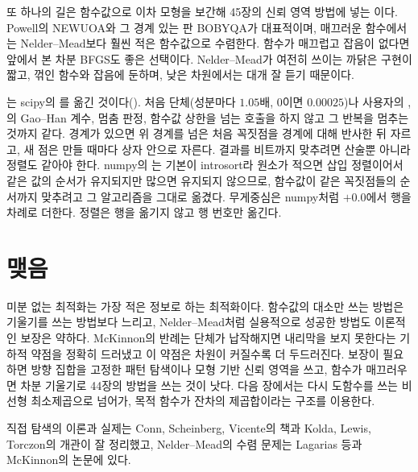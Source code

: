 또 하나의 길은 함수값으로 이차 모형을 보간해 45장의 신뢰 영역 방법에 넣는 이다. Powell의 NEWUOA\cite{powell2006newuoa}와 그 경계 있는 판 BOBYQA가 대표적이며, 매끄러운 함수에서는 Nelder--Mead보다 훨씬 적은 함수값으로 수렴한다. 함수가 매끄럽고 잡음이 없다면 앞에서 본 차분 BFGS도 좋은 선택이다. Nelder--Mead가 여전히 쓰이는 까닭은 구현이 짧고, 꺾인 함수와 잡음에 둔하며, 낮은 차원에서는 대개 잘 듣기 때문이다.

\begin{instardust}
는 scipy의 를 옮긴 것이다(). 처음 단체(성분마다 $1.05$배, $0$이면 $0.00025$)나 사용자의 , 의 Gao--Han 계수, 멈춤 판정, 함수값 상한을 넘는 호출을 하지 않고 그 반복을 멈추는 것까지 같다. 경계가 있으면 위 경계를 넘은 처음 꼭짓점을 경계에 대해 반사한 뒤 자르고, 새 점은 만들 때마다 상자 안으로 자른다. 결과를 비트까지 맞추려면 산술뿐 아니라 정렬도 같아야 한다. numpy의 는 기본이 introsort라 원소가 적으면 삽입 정렬이어서 같은 값의 순서가 유지되지만 많으면 유지되지 않으므로, 함수값이 같은 꼭짓점들의 순서까지 맞추려고 그 알고리즘을 그대로 옮겼다. 무게중심은 numpy처럼 $+0.0$에서 행을 차례로 더한다. 정렬은 행을 옮기지 않고 행 번호만 옮긴다.
\end{instardust}

\section{맺음}

미분 없는 최적화는 가장 적은 정보로 하는 최적화이다. 함수값의 대소만 쓰는 방법은 기울기를 쓰는 방법보다 느리고, Nelder--Mead처럼 실용적으로 성공한 방법도 이론적인 보장은 약하다. McKinnon의 반례는 단체가 납작해지면 내리막을 보지 못한다는 기하적 약점을 정확히 드러냈고 이 약점은 차원이 커질수록 더 두드러진다. 보장이 필요하면 방향 집합을 고정한 패턴 탐색이나 모형 기반 신뢰 영역을 쓰고, 함수가 매끄러우면 차분 기울기로 44장의 방법을 쓰는 것이 낫다. 다음 장에서는 다시 도함수를 쓰는 비선형 최소제곱으로 넘어가, 목적 함수가 잔차의 제곱합이라는 구조를 이용한다.

직접 탐색의 이론과 실제는 Conn, Scheinberg, Vicente의 책\cite{conn2009dfo}과 Kolda, Lewis, Torczon의 개관\cite{kolda2003}이 잘 정리했고, Nelder--Mead의 수렴 문제는 Lagarias 등\cite{lagarias1998}과 McKinnon\cite{mckinnon1998}의 논문에 있다.

\chapterreferences

